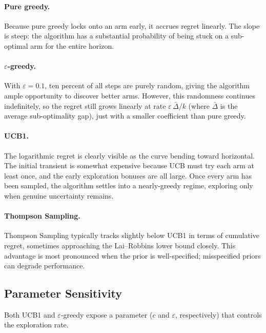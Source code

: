 \paragraph{Pure greedy.} Because pure greedy locks onto an arm early, it accrues regret linearly.  The slope is steep: the algorithm has a substantial probability of being stuck on a sub-optimal arm for the entire horizon.

\paragraph{$\varepsilon$-greedy.} With $\varepsilon=0.1$, ten percent of all steps are purely random, giving the algorithm ample opportunity to discover better arms.  However, this randomness continues indefinitely, so the regret still grows linearly at rate $\varepsilon\,\bar\Delta/k$ (where $\bar\Delta$ is the average sub-optimality gap), just with a smaller coefficient than pure greedy.

\paragraph{UCB1.} The logarithmic regret is clearly visible as the curve bending toward horizontal.  The initial transient is somewhat expensive because UCB must try each arm at least once, and the early exploration bonuses are all large.  Once every arm has been sampled, the algorithm settles into a nearly-greedy regime, exploring only when genuine uncertainty remains.

\paragraph{Thompson Sampling.} Thompson Sampling typically tracks slightly below UCB1 in terms of cumulative regret, sometimes approaching the Lai--Robbins lower bound closely.  This advantage is most pronounced when the prior is well-specified; misspecified priors can degrade performance.

\subsection*{Parameter Sensitivity}

Both UCB1 and $\varepsilon$-greedy expose a parameter ($c$ and $\varepsilon$, respectively) that controls the exploration rate.


